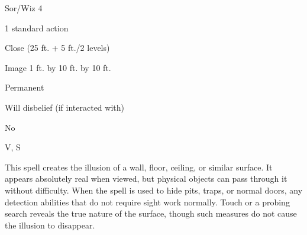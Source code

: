 
\begin{description*}
\item[Level:] Sor/Wiz 4
\item[Casting Time:] 1 standard action
\item[Range:] Close (25 ft. + 5 ft./2 levels)
\item[Effect:] Image 1 ft. by 10 ft. by 10 ft.
\item[Duration:] Permanent
\item[Saving Throw:] Will disbelief (if interacted with)
\item[Spell Resistance:] No
\item[Components:] V, S
\end{description*}

This spell creates the illusion of a wall, floor, ceiling, or similar surface.
It appears absolutely real when viewed, but physical objects can pass through it
without difficulty. When the spell is used to hide pits, traps, or normal doors,
any detection abilities that do not require sight work normally. Touch or a probing
search reveals the true nature of the surface, though such measures do not cause
the illusion to disappear.